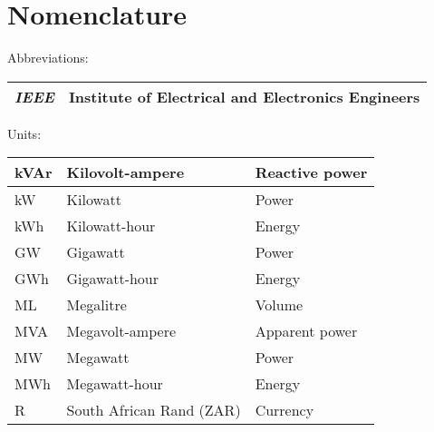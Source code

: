 

\cleardoublepage
{}
\chapter*{Nomenclature}

\begin{center}
Abbreviations:
\end{center}
\begin{table}[H]
\centering
\begin{small}
{\tabulinesep=1.4mm
\begin{tabu}{ | l | l | }
        \hline \textit{IEEE} & Institute of Electrical and Electronics Engineers \\
        \hline
\end{tabu}}
\end{small}
\end{table}

\begin{center}
Units:
\end{center}
\begin{table}[H]
\centering
\begin{small}
{\tabulinesep=1.4mm
\begin{tabu}{| l | l | l |}
        \hline kVAr     & Kilovolt-ampere          & Reactive power\\
        \hline kW       & Kilowatt                 & Power\\
        \hline kWh      & Kilowatt-hour            & Energy\\
        \hline GW       & Gigawatt                 & Power\\
        \hline GWh      & Gigawatt-hour            & Energy\\
        \hline ML       & Megalitre                & Volume\\
        \hline MVA      & Megavolt-ampere          & Apparent power\\
        \hline MW       & Megawatt                 & Power\\
        \hline MWh      & Megawatt-hour            & Energy\\
        \hline R        & South African Rand (ZAR) & Currency\\
        \hline
\end{tabu}}
\end{small}
\end{table}
